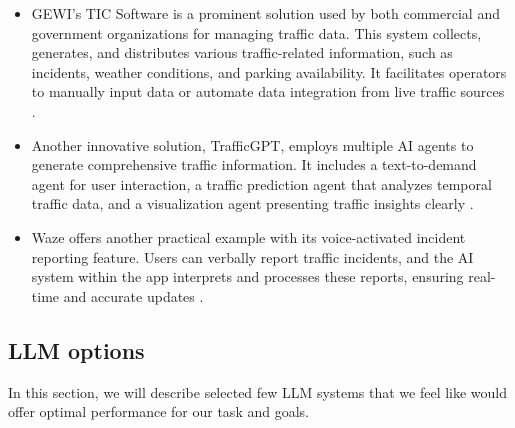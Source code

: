 \documentclass[fleqn,moreauthors,10pt]{ds_report}
\begin{document}
\begin{itemize}
    \item GEWI's TIC Software is a prominent solution used by both commercial and government organizations for managing traffic data. This system collects, generates, and distributes various traffic-related information, such as incidents, weather conditions, and parking availability. It facilitates operators to manually input data or automate data integration from live traffic sources \cite{gewi2024}.
    
    \item Another innovative solution, TrafficGPT, employs multiple AI agents to generate comprehensive traffic information. It includes a text-to-demand agent for user interaction, a traffic prediction agent that analyzes temporal traffic data, and a visualization agent presenting traffic insights clearly \cite{trafficgpt2024}.
    
    \item Waze offers another practical example with its voice-activated incident reporting feature. Users can verbally report traffic incidents, and the AI system within the app interprets and processes these reports, ensuring real-time and accurate updates \cite{waze2024}.
\end{itemize}

\subsection{LLM options}

In this section, we will describe selected few LLM systems that we feel like would offer optimal performance for our task and goals.
\end{document}
